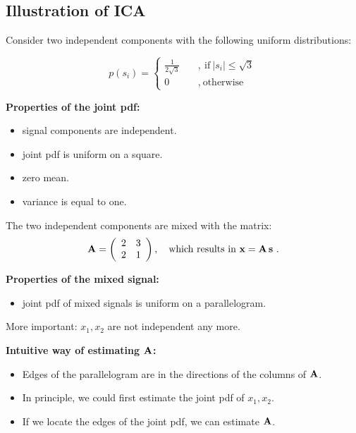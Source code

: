 \subsection{Illustration of ICA}

  Consider two independent components with the following uniform distributions:

  \begin{displaymath}
    p(s_i) = \begin{cases}
      \frac{1}{2\sqrt{3}} \quad &, ~\mbox{if}~|s_i| \leq \sqrt{3} \\
      0 \quad &, ~\mbox{otherwise}
    \end{cases}
  \end{displaymath}

  \textbf{Properties of the joint pdf:}
  \begin{itemize}
    \item signal components are independent.
    \item joint pdf is uniform on a square.
    \item zero mean.
    \item variance is equal to one.
  \end{itemize}

  The two independent components are mixed with the matrix:
  \begin{displaymath}
    \mathbf{A} = \left(
      \begin{array}{cc}
        2 & 3 \\
        2 & 1
      \end{array}
    \right),
    \quad \mbox{which results in}~ \bm{\mathrm{x}} = \mathbf{A} \, \bm{\mathrm{s}} ~.
  \end{displaymath}

  \textbf{Properties of the mixed signal:}
  \begin{itemize}
    \item joint pdf of mixed signals is uniform on a parallelogram.
  \end{itemize}

  More important: $x_1, x_2$ are not independent any more.

  \textbf{Intuitive way of estimating $\mathbf{A}$:}
  \begin{itemize}
    \item Edges of the parallelogram are in the directions of the columns of $\mathbf{A}$.
    \item In principle, we could first estimate the joint pdf of $x_1, x_2$.
    \item If we locate the edges of the joint pdf, we can estimate $\mathbf{A}$.
  \end{itemize}

